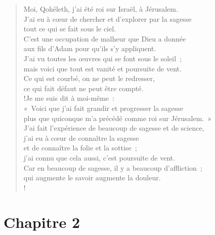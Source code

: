 \documentclass[french,twoside]{book} %
\begin{document}
\begin{verse}
Moi, Qohéleth, j’ai été roi sur Israël, à Jérusalem.\\
J’ai eu à cœur de chercher et d’explorer par la sagesse \\
tout ce qui se fait sous le ciel. \\
C’est une occupation de malheur que Dieu a donnée \\
aux fils d’Adam pour qu’ils s’y appliquent.\\
J’ai vu toutes les œuvres qui se font sous le soleil ; \\
mais voici que tout est vanité et poursuite de vent.\\
Ce qui est courbé, on ne peut le redresser, \\
ce qui fait défaut ne peut être compté.\\!Je me suis dit à moi-même : \\
« Voici que j’ai fait grandir et progresser la sagesse \\
plus que quiconque m’a précédé comme roi sur Jérusalem. » \\
J’ai fait l’expérience de beaucoup de sagesse et de science,\\
j’ai eu à cœur de connaître la sagesse \\
et de connaître la folie et la sottise ; \\
j’ai connu que cela aussi, c’est poursuite de vent.\\
Car en beaucoup de sagesse, il y a beaucoup d’affliction ; \\
qui augmente le savoir augmente la douleur.\\!
\end{verse}
\section[Chapitre 2]{Chapitre 2}\renewcommand{\leftmark}{Chapitre 2}
\end{document}
